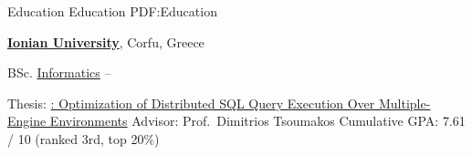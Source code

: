 
\Section
{Education}
{Education}
{PDF:Education}

\Entry
\href{http://www.ionio.gr}
{\textbf{Ionian University}},
Corfu, Greece

\Gap
\BulletItem
BSc.
\href{http://di.ionio.gr}
{Informatics}
\hfill
{} --
\begin{Detail}
\SubBulletItem
Thesis:
\href{http://www.cslab.ece.ntua.gr/~vgian/papers/thesis.pdf}
{: Optimization of Distributed SQL Query Execution Over Multiple-Engine Environments}
\SubBulletItem
Advisor:
Prof.~Dimitrios Tsoumakos
\SubBulletItem
Cumulative GPA: 7.61 / 10 (ranked 3rd, top 20\%)
\end{Detail}
